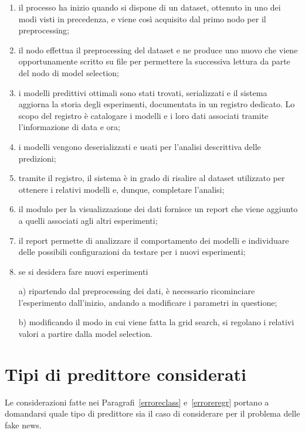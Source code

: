 \documentclass[12pt]{report}
\theoremstyle{definition}
\begin{document}
\begin{enumerate}
    \item il processo ha inizio quando si dispone di un dataset, ottenuto in uno dei modi visti in precedenza, e viene così acquisito dal primo nodo per il preprocessing;
    \item  il nodo effettua il preprocessing del dataset e ne produce uno nuovo che viene opportunamente scritto su file per permettere la successiva lettura da parte del nodo di model selection;
    \item i modelli predittivi ottimali sono stati trovati, serializzati e il sistema aggiorna la storia degli esperimenti, documentata in un registro dedicato. Lo scopo del registro è catalogare i modelli e i loro dati associati tramite l'informazione di data e ora;
    \item i modelli vengono deserializzati e usati per l'analisi descrittiva delle predizioni;
    \item tramite il registro, il sistema è in grado di risalire al dataset utilizzato per ottenere i relativi modelli e, dunque, completare l'analisi;
    \item il modulo per la visualizzazione dei dati fornisce un report che viene aggiunto a quelli associati agli altri esperimenti;
    \item il report permette di analizzare il comportamento dei modelli e individuare delle possibili configurazioni da testare per i nuovi esperimenti;
    \item se si desidera fare nuovi esperimenti
    
    a) ripartendo dal preprocessing dei dati, è necessario ricominciare l'esperimento dall'inizio, andando a modificare i parametri in questione;
    
    b) modificando il modo in cui viene fatta la grid search, si regolano i relativi valori a partire dalla model selection.
\end{enumerate}

\section{Tipi di predittore considerati}\label{predictors}
Le considerazioni fatte nei Paragrafi~\ref{erroreclass} e~\ref{erroreregr} portano a domandarsi quale tipo di predittore sia il caso di considerare per il problema delle fake news.
\end{document}
